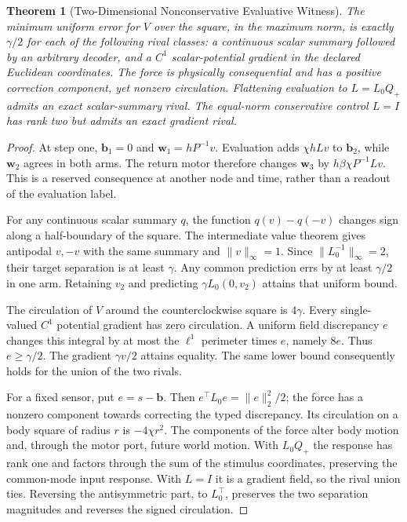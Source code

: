 \documentclass[11pt,a4paper]{article}
\newtheorem{theorem}{Theorem}[section]
\theoremstyle{definition}
\begin{document}
\begin{theorem}[Two-Dimensional Nonconservative Evaluative Witness]\label{thm:bridge-typed-valence}
The minimum uniform error for $V$ over the square, in the maximum norm, is exactly $\gamma/2$ for each of the following rival classes: a continuous scalar summary followed by an arbitrary decoder, and a $C^1$ scalar-potential gradient in the declared Euclidean coordinates. The force is physically consequential and has a positive correction component, yet nonzero circulation. Flattening evaluation to $L=L_0Q_+$ admits an exact scalar-summary rival. The equal-norm conservative control $L=I$ has rank two but admits an exact gradient rival.
\end{theorem}
\begin{proof}
At step one, $\mathbf b_1=0$ and $\mathbf w_1=hP^{-1}v$. Evaluation adds $\chi hLv$ to $\mathbf b_2$, while $\mathbf w_2$ agrees in both arms. The return motor therefore changes $\mathbf w_3$ by $h\beta\chi P^{-1}Lv$. This is a reserved consequence at another node and time, rather than a readout of the evaluation label.

For any continuous scalar summary $q$, the function $q(v)-q(-v)$ changes sign along a half-boundary of the square. The intermediate value theorem gives antipodal $v,-v$ with the same summary and $\|v\|_\infty=1$. Since $\|L_0^{-1}\|_\infty=2$, their target separation is at least $\gamma$. Any common prediction errs by at least $\gamma/2$ in one arm. Retaining $v_2$ and predicting $\gamma L_0(0,v_2)$ attains that uniform bound.

The circulation of $V$ around the counterclockwise square is $4\gamma$. Every single-valued $C^1$ potential gradient has zero circulation. A uniform field discrepancy $e$ changes this integral by at most the $\ell^1$ perimeter times $e$, namely $8e$. Thus $e\ge\gamma/2$. The gradient $\gamma v/2$ attains equality. The same lower bound consequently holds for the union of the two rivals.

For a fixed sensor, put $e=s-\mathbf b$. Then $e^\top L_0e=\|e\|_2^2/2$; the force has a nonzero component towards correcting the typed discrepancy. Its circulation on a body square of radius $r$ is $-4\chi r^2$. The components of the force alter body motion and, through the motor port, future world motion. With $L_0Q_+$ the response has rank one and factors through the sum of the stimulus coordinates, preserving the common-mode input response. With $L=I$ it is a gradient field, so the rival union ties. Reversing the antisymmetric part, to $L_0^\top$, preserves the two separation magnitudes and reverses the signed circulation.
\end{proof}
\end{document}
